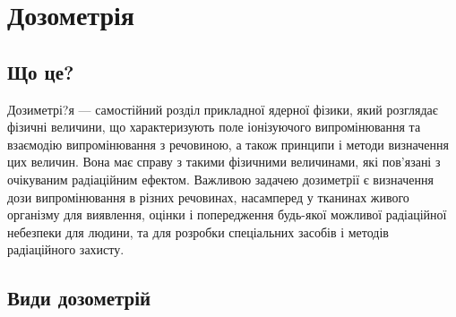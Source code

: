 \documentclass{article}
\begin{document}
\section{Дозометрія}
\subsection{Що це?}
Дозиметрі?я — самостійний розділ прикладної ядерної фізики, який розглядає фізичні величини, що характеризують поле іонізуючого випромінювання та взаємодію випромінювання з речовиною, а також принципи і методи визначення цих величин. Вона має справу з такими фізичними величинами, які пов'язані з очікуваним радіаційним ефектом. Важливою задачею дозиметрії є визначення дози випромінювання в різних речовинах, насамперед у тканинах живого організму для виявлення, оцінки і попередження будь-якої можливої радіаційної небезпеки для людини, та для розробки спеціальних засобів і методів радіаційного захисту.

\subsection{Види дозометрій}
\end{document}

